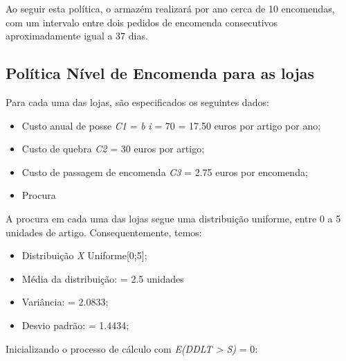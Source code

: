 Ao seguir esta política, o armazém realizará por ano cerca de 10 encomendas, com um intervalo entre dois pedidos de encomenda consecutivos aproximadamente igual a 37 dias.   


\subsection{Política Nível de Encomenda para as lojas}

Para cada uma das lojas, são especificados os seguintes dados:

\begin{itemize}
\item Custo anual de posse \emph{C1} = \emph{b} \times \emph{i} = 70  = 17.50 euros por artigo por ano;
\item Custo de quebra \emph{C2} = 30 euros por artigo;
\item Custo de passagem de encomenda \emph{C3} = 2.75 euros por encomenda;
\item Procura 
\end{itemize}

A procura em cada uma das lojas segue uma distribuição uniforme, entre 0 a 5 unidades de artigo. Consequentemente, temos:

\begin{itemize}
\item Distribuição \emph{X} \approx Uniforme[0;5];
\item Média da distribuição:  = 2.5 unidades
\item Variância:  = 2.0833;
\item Desvio padrão:  = 1.4434;
\end{itemize}

Inicializando o processo de cálculo com \emph{E(DDLT > S)} = 0:

